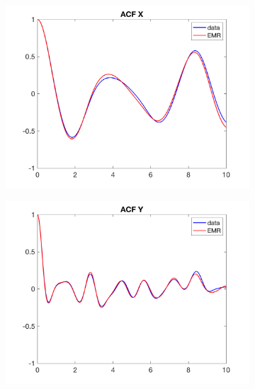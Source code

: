 \documentclass[12pt]{article}
\begin{document}
\begin{figure}[H]
	\centering
	\begin{subfigure}[b]{0.3\textwidth}
		\centering
		\includegraphics[width=\textwidth]{plots/l84l63/acfxl840025.png}
	\end{subfigure}
	\hfill
	\begin{subfigure}[b]{0.3\textwidth}
		\centering
		\includegraphics[width=\textwidth]{plots/l84l63/acfyl840025.png}
	\end{subfigure}
	\hfill
	\begin{subfigure}[b]{0.3\textwidth}
		\centering

\end{subfigure}
\end{figure}
\end{document}
